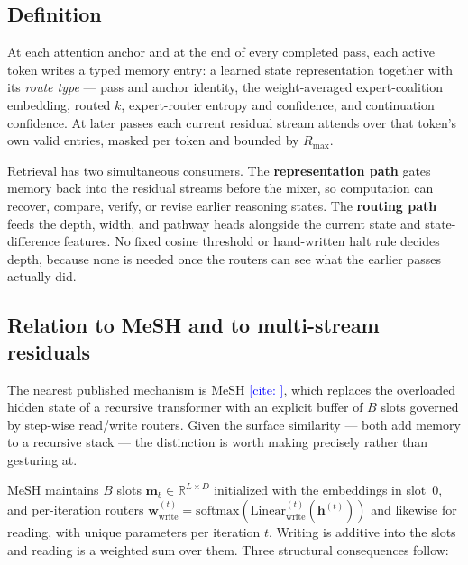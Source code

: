 \documentclass[11pt]{article}
\newcommand{\CITE}[1]{\textcolor{blue}{[cite: \detokenize{#1}]}}
\newcommand{\Rmax}{R_{\max}}
\begin{document}
\subsection{Definition}

At each attention anchor and at the end of every completed pass, each active
token writes a typed memory entry: a learned state representation together with
its \emph{route type} --- pass and anchor identity, the weight-averaged
expert-coalition embedding, routed $k$, expert-router entropy and confidence, and
continuation confidence. At later passes each current residual stream attends
over that token's own valid entries, masked per token and bounded by $\Rmax$.

Retrieval has two simultaneous consumers. The \textbf{representation path} gates
memory back into the residual streams before the mixer, so computation can
recover, compare, verify, or revise earlier reasoning states. The \textbf{routing
path} feeds the depth, width, and pathway heads alongside the current state and
state-difference features. No fixed cosine threshold or hand-written halt rule
decides depth, because none is needed once the routers can see what the earlier
passes actually did.

\subsection{Relation to MeSH and to multi-stream residuals}
\label{sec:mesh}

The nearest published mechanism is MeSH \CITE{mesh2025}, which replaces the
overloaded hidden state of a recursive transformer with an explicit buffer of $B$
slots governed by step-wise read/write routers. Given the surface similarity ---
both add memory to a recursive stack --- the distinction is worth making
precisely rather than gesturing at.

MeSH maintains $B$ slots $\mathbf{m}_b \in \mathbb{R}^{L \times D}$ initialized
with the embeddings in slot~0, and per-iteration routers
$\mathbf{w}^{(t)}_{\mathrm{write}} = \mathrm{softmax}(\mathrm{Linear}^{(t)}_{\mathrm{write}}(\mathbf{h}^{(t)}))$
and likewise for reading, with unique parameters per iteration $t$. Writing is
additive into the slots and reading is a weighted sum over them. Three structural
consequences follow:
\end{document}
